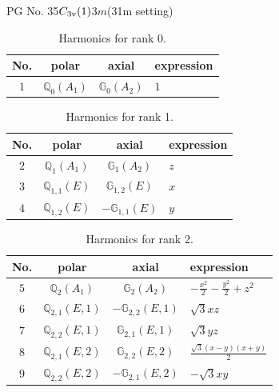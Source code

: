 \documentclass[fleqn,8pt,landscape]{jsarticle}
\begin{document}
\setcounter{MaxMatrixCols}{32}

\renewcommand{\tablename}{Table~}
\renewcommand{\figurename}{Figure~}
\begin{center}
\LARGE
PG No. 35\quad$C_{\rm 3v}(1)$\quad$3m$\quad(31m setting)\quad[ trigonal ]
\end{center}
\begin{table}[ht!]
\begin{center}
\caption{Harmonics for rank 0.}
\renewcommand{\arraystretch}{1.3}
\begin{tabular}{cccl} \hline \hline
No. & polar & axial & expression \\ \hline
$ 1 $ & $ \mathbb{Q}_{0}(A_{1}) $ & $ \mathbb{G}_{0}(A_{2}) $ & $ 1 $ \\
 \hline \hline
\end{tabular}
\end{center}
\end{table}
\begin{table}[ht!]
\begin{center}
\caption{Harmonics for rank 1.}
\renewcommand{\arraystretch}{1.3}
\begin{tabular}{cccl} \hline \hline
No. & polar & axial & expression \\ \hline
$ 2 $ & $ \mathbb{Q}_{1}(A_{1}) $ & $ \mathbb{G}_{1}(A_{2}) $ & $ z $ \\
$ 3 $ & $ \mathbb{Q}_{1,1}(E) $ & $ \mathbb{G}_{1,2}(E) $ & $ x $ \\
$ 4 $ & $ \mathbb{Q}_{1,2}(E) $ & $ -\mathbb{G}_{1,1}(E) $ & $ y $ \\
 \hline \hline
\end{tabular}
\end{center}
\end{table}
\begin{table}[ht!]
\begin{center}
\caption{Harmonics for rank 2.}
\renewcommand{\arraystretch}{1.3}
\begin{tabular}{cccl} \hline \hline
No. & polar & axial & expression \\ \hline
$ 5 $ & $ \mathbb{Q}_{2}(A_{1}) $ & $ \mathbb{G}_{2}(A_{2}) $ & $ - \frac{x^{2}}{2} - \frac{y^{2}}{2} + z^{2} $ \\
$ 6 $ & $ \mathbb{Q}_{2,1}(E,1) $ & $ -\mathbb{G}_{2,2}(E,1) $ & $ \sqrt{3} x z $ \\
$ 7 $ & $ \mathbb{Q}_{2,2}(E,1) $ & $ \mathbb{G}_{2,1}(E,1) $ & $ \sqrt{3} y z $ \\
$ 8 $ & $ \mathbb{Q}_{2,1}(E,2) $ & $ \mathbb{G}_{2,2}(E,2) $ & $ \frac{\sqrt{3} \left(x - y\right) \left(x + y\right)}{2} $ \\
$ 9 $ & $ \mathbb{Q}_{2,2}(E,2) $ & $ -\mathbb{G}_{2,1}(E,2) $ & $ - \sqrt{3} x y $ \\
 \hline \hline
\end{tabular}
\end{center}
\end{table}
\end{document}
